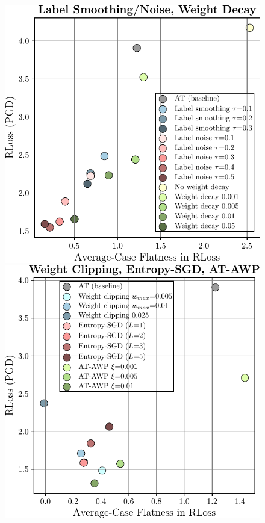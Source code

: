 \begin{figure}[t]
\begin{minipage}{\textwidth}
\begin{minipage}[t]{0.18\textwidth}
		\includegraphics[width=\textwidth]{plots_supp_flatness_correlation_seq_loss_methods_ls}
	\end{minipage}
	\begin{minipage}[t]{0.18\textwidth}
		\vspace*{0px}
				
		\includegraphics[width=\textwidth]{plots_supp_flatness_correlation_seq_loss_methods_flat}
	\end{minipage}
	\begin{minipage}[t]{0.26\textwidth}
		\vspace*{0px}
				

\end{minipage}
\end{minipage}
\end{figure}
